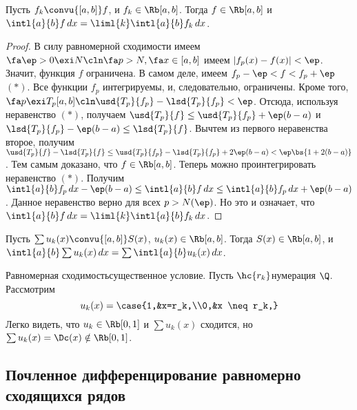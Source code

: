 \documentclass[a4paper]{article}
\newcommand{\intlab}{\intl{a}{b}}
\begin{document}
\begin{theorem}[Об интегрировании]
Пусть $f_k\convu{[a,b]}f$, и $f_k \in\Rb[a,b]$. Тогда $f \in\Rb[a,b]$ и $\intlab f\,d
x=\liml{k}\intlab f_k\,d x$.
\end{theorem}
\begin{proof}
В силу равномерной сходимости имеем $\fa \ep >0 \exi N\cln \fa p>N, \fa x \in [a,b]$ имеем
$|f_p(x)-f(x)|<\ep$. Значит, функция $f$ ограничена. В самом деле, имеем $f_p -\ep < f < f_p+\ep$
$(*)$. Все функции $f_p$ интегрируемы, и, следовательно, ограничены. Кроме того, $\fa p \exi
T_p[a,b]\cln \usd{T_p}{f_p}-\lsd{T_p}{f_p} < \ep$. Отсюда, используя неравенство $(*)$, получаем
$\usd{T_p}{f} \le \usd{T_p}{f_p}+\ep(b-a)$ и $\lsd{T_p}{f_p}-\ep(b-a) \le \lsd{T_p}{f}$. Вычтем из
первого неравенства второе, получим $\usd{T_p}{f}-\lsd{T_p}{f} \le
\usd{T_p}{f_p}-\lsd{T_p}{f_p}+2\ep(b-a) < \ep\bs{1+2(b-a)}$. Тем самым доказано, что $f
\in\Rb[a,b]$. Теперь можно проинтегрировать неравенство $(*)$. Получим $\intlab f_p\,d x
-\ep(b-a)\le \intlab f\,d x\le \intlab f_p\,d x+\ep(b-a)$. Данное неравенство верно для всех
$p>N(\ep)$. Но это и означает, что $\intlab f\,d x=\liml{k}\intlab f_k\,d x$.
\end{proof}

\begin{imp}
Пусть $\sum u_k(x)\convu{[a,b]}S(x)$, $u_k(x)\in\Rb[a,b]$. Тогда $S(x) \in\Rb[a,b]$, и $\intlab
\sum u_k(x)\,d x=\sum \intlab u_k(x)\,d x$.
\end{imp}

\begin{note}
Равномерная сходимость\т существенное условие. Пусть $\hc{r_k}$\т нумерация $\Q$. Рассмотрим
$$u_k(x) =\case{1,&x=r_k,\\0,&x \neq r_k,}$$
Легко видеть, что $u_k \in\Rb[0,1]$ и $\sum u_k(x)$ сходится,
но $\sum u_k(x) = \Dc(x) \notin \Rb[0,1]$.
\end{note}

\subsection{Почленное дифференцирование равномерно сходящихся рядов}
\end{document}
